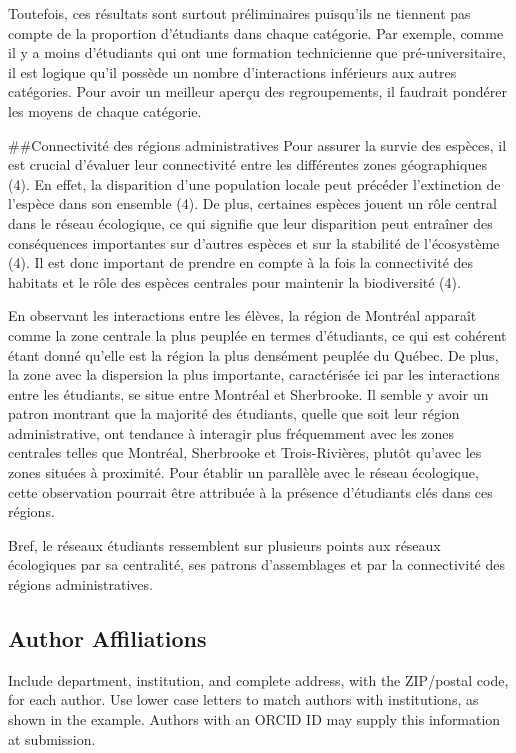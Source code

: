 \documentclass[9pt,twocolumn,twoside,]{pnas-new}
\begin{document}
Toutefois, ces résultats sont surtout préliminaires puisqu'ils ne
tiennent pas compte de la proportion d'étudiants dans chaque catégorie.
Par exemple, comme il y a moins d'étudiants qui ont une formation
technicienne que pré-universitaire, il est logique qu'il possède un
nombre d'interactions inférieurs aux autres catégories. Pour avoir un
meilleur aperçu des regroupements, il faudrait pondérer les moyens de
chaque catégorie.

\#\#Connectivité des régions administratives Pour assurer la survie des
espèces, il est crucial d'évaluer leur connectivité entre les
différentes zones géographiques (4). En effet, la disparition d'une
population locale peut précéder l'extinction de l'espèce dans son
ensemble (4). De plus, certaines espèces jouent un rôle central dans le
réseau écologique, ce qui signifie que leur disparition peut entraîner
des conséquences importantes sur d'autres espèces et sur la stabilité de
l'écosystème (4). Il est donc important de prendre en compte à la fois
la connectivité des habitats et le rôle des espèces centrales pour
maintenir la biodiversité (4).

En observant les interactions entre les élèves, la région de Montréal
apparaît comme la zone centrale la plus peuplée en termes d'étudiants,
ce qui est cohérent étant donné qu'elle est la région la plus densément
peuplée du Québec. De plus, la zone avec la dispersion la plus
importante, caractérisée ici par les interactions entre les étudiants,
se situe entre Montréal et Sherbrooke. Il semble y avoir un patron
montrant que la majorité des étudiants, quelle que soit leur région
administrative, ont tendance à interagir plus fréquemment avec les zones
centrales telles que Montréal, Sherbrooke et Trois-Rivières, plutôt
qu'avec les zones situées à proximité. Pour établir un parallèle avec le
réseau écologique, cette observation pourrait être attribuée à la
présence d'étudiants clés dans ces régions.

Bref, le réseaux étudiants ressemblent sur plusieurs points aux réseaux
écologiques par sa centralité, ses patrons d'assemblages et par la
connectivité des régions administratives.

\hypertarget{author-affiliations}{%
\subsection*{Author Affiliations}\label{author-affiliations}}

Include department, institution, and complete address, with the
ZIP/postal code, for each author. Use lower case letters to match
authors with institutions, as shown in the example. Authors with an
ORCID ID may supply this information at submission.
\end{document}
